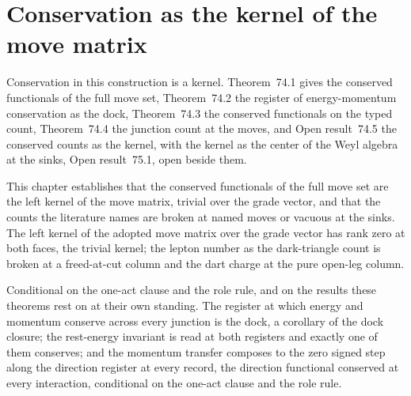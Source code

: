 \par\medskip{}\label{narr:close:4-5}\par
\section{Conservation as the kernel of the move matrix}\label{mod:IV-6-conservation-as-the-kernel-of-the-move-matrix}
\label{narr:open:4-6}Conservation in this construction is a kernel. Theorem~74.1 gives the conserved functionals of the full move set, Theorem~74.2 the register of energy-momentum conservation as the dock, Theorem~74.3 the conserved functionals on the typed count, Theorem~74.4 the junction count at the moves, and Open result~74.5 the conserved counts as the kernel, with the kernel as the center of the Weyl algebra at the sinks, Open result~75.1, open beside them.
\begin{chtheorem}\label{box:IV-6-conservation-as-the-kernel-of-the-move-matrix:1}
This chapter establishes that the conserved functionals of the full move set are the left kernel of the move matrix, trivial over the grade vector, and that the counts the literature names are broken at named moves or vacuous at the sinks. The left kernel of the adopted move matrix over the grade vector has rank zero at both faces, the trivial kernel; the lepton number as the dark-triangle count is broken at a freed-at-cut column and the dart charge at the pure open-leg column.
\end{chtheorem}
\begin{chconditional}\label{box:IV-6-conservation-as-the-kernel-of-the-move-matrix:2}
Conditional on the one-act clause and the role rule, and on the results these theorems rest on at their own standing.
The register at which energy and momentum conserve across every junction is the dock, a corollary of the dock closure; the rest-energy invariant is read at both registers and exactly one of them conserves; and the momentum transfer composes to the zero signed step along the direction register at every record, the direction functional conserved at every interaction, conditional on the one-act clause and the role rule.
\end{chconditional}
